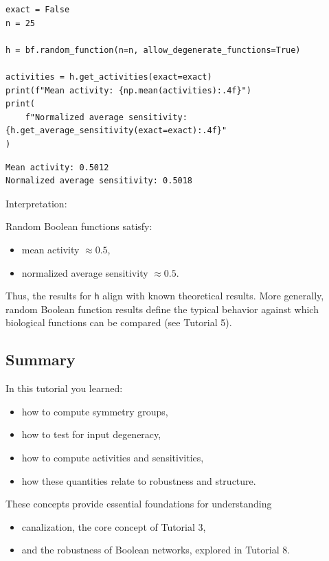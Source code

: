 \documentclass[
]{article}
\providecommand{\tightlist}{%
  \setlength{\itemsep}{0pt}\setlength{\parskip}{0pt}}
\begin{document}
\begin{lstlisting}
exact = False
n = 25

h = bf.random_function(n=n, allow_degenerate_functions=True)

activities = h.get_activities(exact=exact)
print(f"Mean activity: {np.mean(activities):.4f}")
print(
    f"Normalized average sensitivity: {h.get_average_sensitivity(exact=exact):.4f}"
)
\end{lstlisting}

\begin{lstlisting}
Mean activity: 0.5012
Normalized average sensitivity: 0.5018
\end{lstlisting}

Interpretation:

Random Boolean functions satisfy:

\begin{itemize}
\tightlist
\item
  mean activity \(\approx 0.5\),
\item
  normalized average sensitivity \(\approx 0.5\).
\end{itemize}

Thus, the results for \texttt{h} align with known theoretical results.
More generally, random Boolean function results define the typical
behavior against which biological functions can be compared (see
Tutorial 5).

\subsection{Summary}\label{summary-1}

In this tutorial you learned:

\begin{itemize}
\tightlist
\item
  how to compute symmetry groups,
\item
  how to test for input degeneracy,
\item
  how to compute activities and sensitivities,
\item
  how these quantities relate to robustness and structure.
\end{itemize}

These concepts provide essential foundations for understanding

\begin{itemize}
\tightlist
\item
  canalization, the core concept of Tutorial 3,
\item
  and the robustness of Boolean networks, explored in Tutorial 8.
\end{itemize}
\end{document}
